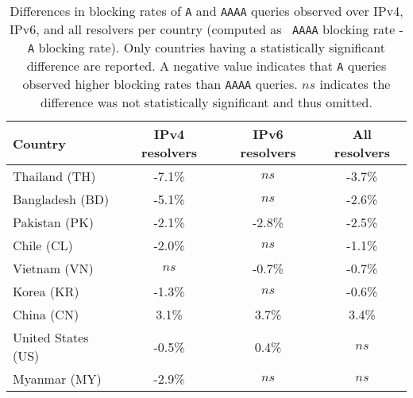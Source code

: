 \begin{table}[t]
  \centering
  \small
  \scalebox{\tabularscale} {
  \begin{tabular}{lccc}%
    \toprule
    {\bf Country}&{\bf IPv4 resolvers}&{\bf IPv6 resolvers} & {\bf All resolvers}
    \\ \midrule
    Thailand (TH)      & -7.1\% & $ns$    & -3.7\% \\
    Bangladesh (BD)    & -5.1\% & $ns$    & -2.6\% \\
    Pakistan (PK)      & -2.1\% & -2.8\%  & -2.5\% \\
    Chile (CL)         & -2.0\% & $ns$    & -1.1\% \\
    Vietnam (VN)       & $ns$   & -0.7\%  & -0.7\% \\
    Korea (KR)         & -1.3\% & $ns$    & -0.6\% \\
    China (CN)         &  3.1\% &  3.7\%  &  3.4\% \\
    \midrule
    United States (US) & -0.5\% &  0.4\%  &  $ns$  \\
    Myanmar (MY)       & -2.9\% & $ns$    &  $ns$  \\
    \bottomrule
  \end{tabular}
  }
  \caption{Differences in blocking rates of {\tt A} and {\tt AAAA} queries
  observed over IPv4, IPv6, and all resolvers per country (computed as {\tt
  AAAA} blocking rate - {\tt A} blocking rate). Only countries having
  a statistically significant difference are reported. A negative value
  indicates that {\tt A} queries observed higher blocking rates than {\tt AAAA}
  queries. $ns$ indicates the difference was not statistically significant and
  thus omitted.}
  \label{tab:resources:countries}
\end{table}

